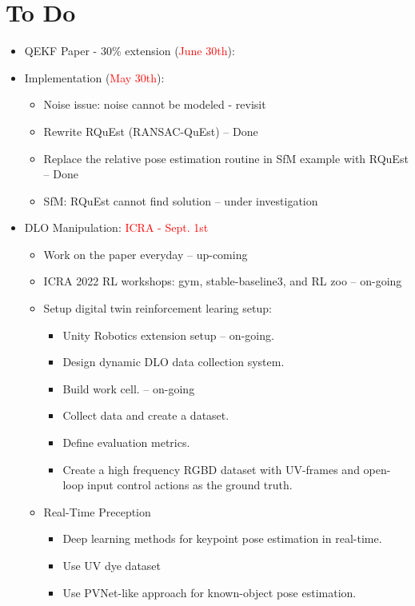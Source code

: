 \documentclass[11pt]{article}
\begin{document}
\section{To Do}
\begin{itemize}
  \item QEKF Paper - 30\% extension (\textcolor{red}{June 30th}):
  \item Implementation (\textcolor{red}{May 30th}):
  \begin{itemize}
      \item Noise issue: noise cannot be modeled - revisit
      \item Rewrite RQuEst (RANSAC-QuEst) -- Done
      \item Replace the relative pose estimation routine in SfM example with RQuEst -- Done
      \item SfM: RQuEst cannot find solution -- under investigation
  \end{itemize}
  \item  DLO Manipulation:  \textcolor{red}{ICRA - Sept. 1st}
  \begin{itemize}
      \item Work on the paper everyday -- up-coming
      \item ICRA 2022 RL workshops: gym, stable-baseline3, and RL zoo -- on-going
      \item Setup digital twin reinforcement learing setup:
      \begin{itemize}
        \item Unity Robotics extension setup -- on-going.
        \item Design dynamic DLO data collection system.
        \item Build work cell. -- on-going
        \item Collect data and create a dataset.
        \item Define evaluation metrics.
        \item Create a high frequency RGBD dataset with UV-frames and open-loop input control actions as the ground truth.
      \end{itemize}
      \item Real-Time Preception
      \begin{itemize}
        \item Deep learning methods for keypoint pose estimation in real-time.
        \item Use UV dye dataset
        \item Use PVNet-like approach for known-object pose estimation.

\end{itemize}
\end{itemize}
\end{itemize}
\end{document}
